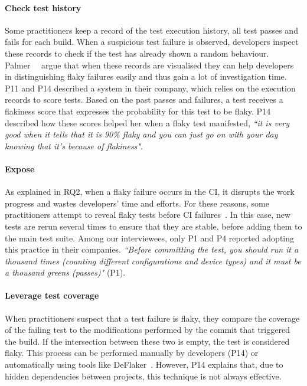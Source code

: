 \paragraph{\textbf{Check test history}}
Some practitioners keep a record of the test execution history, \ie all test passes and fails for each build.
When a suspicious test failure is observed, developers inspect these records to check if the test has already shown a random behaviour.
Palmer~\etal~\cite{FlakinessSpotify} argue that when these records are visualised they can help developers in distinguishing flaky failures easily and thus gain a lot of investigation time.
P11 and P14 described a system in their company, which relies on the execution records to score tests.
Based on the past passes and failures, a test receives a flakiness score that expresses the probability for this test to be flaky.
P14 described how these scores helped her when a flaky test manifested, \textit{``it is very good when it tells that it is 90\% flaky and you can just go on with your day knowing that it's because of flakiness"}.

\paragraph{\textbf{Expose}}
As explained in RQ2, when a flaky failure occurs in the CI, it disrupts the work progress and wastes developers' time and efforts.
For these reasons, some practitioners attempt to reveal flaky tests before CI failures~\cite{liviu_machine_2019,FlakinessSpotify}.
In this case, new tests are rerun several times to ensure that they are stable, before adding them to the main test suite.
Among our interviewees, only P1 and P4 reported adopting this practice in their companies.
\textit{``Before committing the test, you should run it a thousand times (counting different configurations and device types) and it must be a thousand greens (passes)"} (P1).


\paragraph{\textbf{Leverage test coverage}}
When practitioners suspect that a test failure is flaky, they compare the coverage of the failing test to the modifications performed by the commit that triggered the build.
If the intersection between these two is empty, the test is considered flaky.
This process can be performed manually by developers (P14) or automatically using tools like DeFlaker~\cite{Bell2018}.
However, P14 explains that, due to hidden dependencies between projects, this technique is not always effective.



